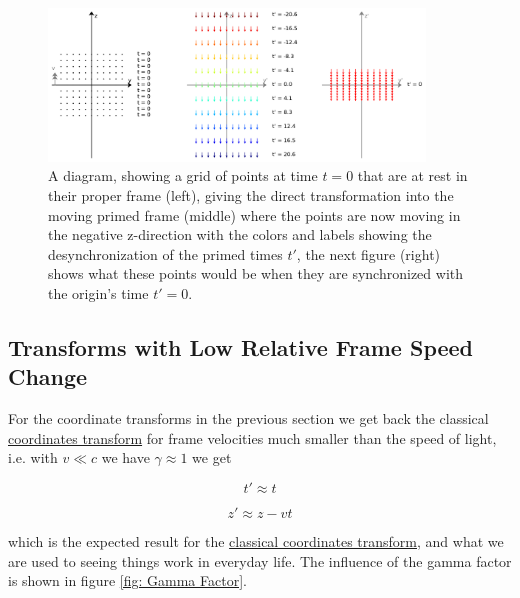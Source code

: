 \begin{figure}[H]
	\centering
	\includegraphics[width=10cm]{images/pdf/coordinate_transforms.pdf}
	\caption{A diagram, showing a grid of points at time $t=0$ that are at rest in their proper frame (left), giving the direct transformation into the moving primed frame (middle) where the points are now moving in the negative z-direction with the colors and labels showing the desynchronization of the primed times $t'$, the next figure (right) shows what these points would be when they are synchronized with the origin's time $t'=0$.}
	\label{fig: coordinate transform}
\end{figure}

\subsection{Transforms with Low Relative Frame Speed Change}

For the coordinate transforms in the previous section we get back the classical \hyperlink{def-galilean-transform}{coordinates transform} for frame velocities much smaller than the speed of light, i.e. with $v\ll c$ we have $\gamma \approx 1$ we get

\begin{equation}
	t' \approx t
\end{equation}

\begin{equation}
	z' \approx z - vt
\end{equation}

which is the expected result for the \hyperlink{def-galilean-transform}{classical coordinates transform}, and what we are used to seeing things work in everyday life. The influence of the gamma factor is shown in figure \ref{fig: Gamma Factor}.

